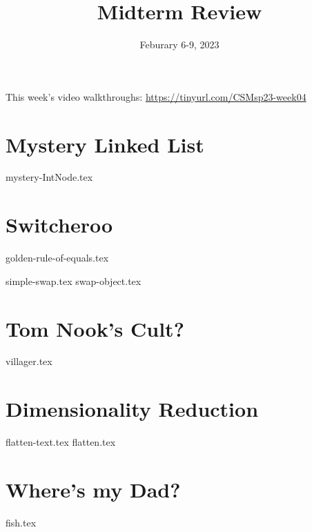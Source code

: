 \documentclass[11pt]{exam}
\title{Midterm Review}
\date{Feburary 6-9, 2023}
\begin{document}
\maketitle
This week's video walkthroughs:
\href{https://tinyurl.com/CSMsp23-week04}{https://tinyurl.com/CSMsp23-week04}

\section{Mystery Linked List}
\begin{questions}
{mystery-IntNode.tex}
\end{questions}



\section{Switcheroo}
{golden-rule-of-equals.tex}
\begin{questions}
{simple-swap.tex}
{swap-object.tex}
\end{questions}

\clearpage


\section{Tom Nook's Cult?}
\begin{questions}
{villager.tex}
\end{questions}

\clearpage


\section{Dimensionality Reduction}
\begin{questions}
{flatten-text.tex}
{flatten.tex}
\end{questions}


\section{Where's my Dad?}

\begin{questions}
{fish.tex}
\end{questions}
\end{document}
